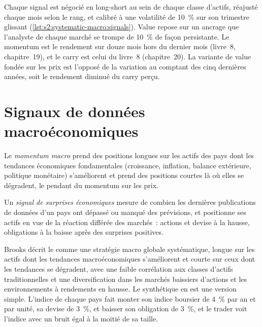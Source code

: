 Chaque signal est négocié en long-short au sein de chaque classe d'actifs, réajusté chaque mois selon le rang, et calibré à une volatilité de 10~\% sur son trimestre glissant
(\cref{lst:s2:systematic-macro:signals}). Value repose sur un ancrage que l'analyste de chaque marché se trompe de 10~\% de façon persistante. Le momentum est le
rendement sur douze mois hors du dernier mois (livre~8, chapitre~19), et le carry est celui du livre~8 (chapitre~20). La variante de value fondée sur les prix est l'opposé
de la variation au comptant des cinq dernières années, soit le rendement diminué du carry perçu.

\section{Signaux de données macroéconomiques}

\begin{definition}\label{def:s2:systematic-macro:momentum}
Le \emph{momentum macro} prend des positions longues sur les actifs des pays dont les tendances économiques fondamentales (croissance, inflation,
balance extérieure, politique monétaire) s'améliorent et prend des positions courtes là où elles se dégradent, le pendant du momentum sur les prix.
\end{definition}

\begin{definition}\label{def:s2:systematic-macro:surprise}
Un \emph{signal de surprises économiques} mesure de combien les dernières publications de données d'un pays ont dépassé ou manqué
des prévisions, et positionne ses actifs en vue de la réaction différée des marchés~: actions et devise à la hausse, obligations à la baisse après des surprises positives.
\end{definition}

Brooks décrit le  comme une stratégie macro globale systématique, longue sur les actifs dont les tendances macroéconomiques s'améliorent et courte sur ceux
dont les tendances se dégradent, avec une faible corrélation aux classes d'actifs traditionnelles et une diversification dans les marchés baissiers d'actions et les environnements à
rendements en hausse. Le  synthétique en est une version simple. L'indice de chaque pays fait monter son indice boursier de 4~\% par an et par unité, sa
devise de 3~\%, et baisser son obligation de 3~\%, et le trader voit l'indice avec un bruit égal à la moitié de sa taille.

